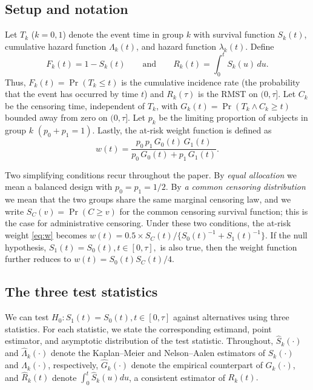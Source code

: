 \documentclass[12pt]{article}
\newcommand{\dd}{\,d}
\begin{document}
\subsection{Setup and notation}
\label{sec:notation}

Let $T_k$ ($k=0,1$) denote the event time in group $k$ with survival
function $S_k(t)$, cumulative hazard function $\Lambda_k(t)$, and hazard function $\lambda_k(t)$.
Define
\begin{equation}
  F_k(t)=1-S_k(t)\qquad \mbox{and} \qquad R_k(t)=\int_0^t S_k(u)\dd u.
\end{equation}
Thus, $F_k(t)=\Pr(T_k\le t)$ is the cumulative incidence rate (the probability
that the event has occurred by time $t$) and $R_k(\tau)$ is the RMST on $(0,\tau]$.
Let $C_k$ be the censoring time, independent of $T_k$, with
$G_k(t)=\Pr(T_k\wedge C_k\ge t)$ bounded away from zero on $(0,\tau]$.
Let $p_k$ be the limiting proportion of subjects in group $k$ $\left(p_0+p_1=1\right)$.
Lastly, the at-risk weight function is defined as
\begin{equation}\label{eq:w}
  w(t)=\frac{p_0\,p_1\,G_0(t)\,G_1(t)}{p_0\,G_0(t)+p_1\,G_1(t)}.
\end{equation}

Two simplifying conditions recur throughout the paper.
By \emph{equal allocation} we mean a balanced design with $p_0=p_1=1/2.$
By \emph{a common censoring distribution} we mean that the two groups
share the same marginal censoring law, and we write
$S_C(v)=\Pr(C\ge v)$ for the common censoring survival function;
this is the case for administrative censoring.
Under these two conditions, the at-risk weight \eqref{eq:w} becomes $w(t)=0.5\times S_C(t)/\{S_0(t)^{-1}+S_1(t)^{-1}\}.$ If the null hypothesis, $S_1(t)=S_0(t), t\in [0, \tau],$ is also true, then  the weight function further reduces to $w(t)=S_0(t)S_C(t)/4$.



\subsection{The three test statistics}
\label{sec:three-stats}

We can test $H_0:S_1(t)=S_0(t), t\in [0, \tau]$ against alternatives using three
statistics.  For each statistic, we state the corresponding estimand, point estimator, and asymptotic distribution of the test statistic.
Throughout, $\hat S_k(\cdot)$ and
$\hat\Lambda_k(\cdot)$ denote the Kaplan--Meier and Nelson--Aalen estimators of
$S_k(\cdot)$ and $\Lambda_k(\cdot)$, respectively, $\hat G_k(\cdot)$ denote the empirical counterpart of $G_k(\cdot)$, and $\hat{R}_k(t)$ denote $\int_0^t \hat{S}_k(u)du$, a consistent estimator of $R_k(t).$
\end{document}
